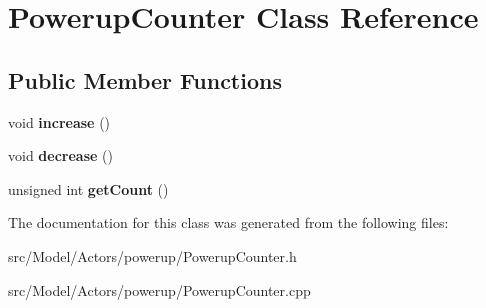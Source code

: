 \hypertarget{classPowerupCounter}{}\section{Powerup\+Counter Class Reference}
\label{classPowerupCounter}
\subsection*{Public Member Functions}
\begin{DoxyCompactItemize}
\item 
void {\bfseries increase} ()\hypertarget{classPowerupCounter_ad5deb6717d21e9b9701dc0eaf68de9a1}{}\label{classPowerupCounter_ad5deb6717d21e9b9701dc0eaf68de9a1}

\item 
void {\bfseries decrease} ()\hypertarget{classPowerupCounter_a23e5306220db04f4762ce8271ba5b7d9}{}\label{classPowerupCounter_a23e5306220db04f4762ce8271ba5b7d9}

\item 
unsigned int {\bfseries get\+Count} ()\hypertarget{classPowerupCounter_a6af7b61c16432e8d6ff199269cbe3f73}{}\label{classPowerupCounter_a6af7b61c16432e8d6ff199269cbe3f73}

\end{DoxyCompactItemize}


The documentation for this class was generated from the following files\+:\begin{DoxyCompactItemize}
\item 
src/\+Model/\+Actors/powerup/Powerup\+Counter.\+h\item 
src/\+Model/\+Actors/powerup/Powerup\+Counter.\+cpp\end{DoxyCompactItemize}

